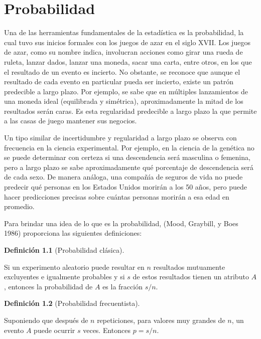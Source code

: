\documentclass[
  us-letterpaper,
]{scrreprt}
\theoremstyle{plain}
\theoremstyle{definition}
\newtheorem{definition}{Definición}[chapter]
\theoremstyle{definition}
\theoremstyle{plain}
\theoremstyle{remark}
\begin{document}
\chapter{Probabilidad}\label{probabilidad}

Una de las herramientas fundamentales de la estadística es la
probabilidad, la cual tuvo sus inicios formales con los juegos de azar
en el siglo XVII. Los juegos de azar, como su nombre indica, involucran
acciones como girar una rueda de ruleta, lanzar dados, lanzar una
moneda, sacar una carta, entre otros, en los que el resultado de un
evento es incierto. No obstante, se reconoce que aunque el resultado de
cada evento en particular pueda ser incierto, existe un patrón
predecible a largo plazo. Por ejemplo, se sabe que en múltiples
lanzamientos de una moneda ideal (equilibrada y simétrica),
aproximadamente la mitad de los resultados serán caras. Es esta
regularidad predecible a largo plazo la que permite a las casas de juego
mantener sus negocios.

Un tipo similar de incertidumbre y regularidad a largo plazo se observa
con frecuencia en la ciencia experimental. Por ejemplo, en la ciencia de
la genética no se puede determinar con certeza si una descendencia será
masculina o femenina, pero a largo plazo se sabe aproximadamente qué
porcentaje de descendencia será de cada sexo. De manera análoga, una
compañía de seguros de vida no puede predecir qué personas en los
Estados Unidos morirán a los 50 años, pero puede hacer predicciones
precisas sobre cuántas personas morirán a esa edad en promedio.

Para brindar una idea de lo que es la probabilidad, (Mood, Graybill, y
Boes 1986) proporciona las siguientes definiciones:

\begin{definition}[Probabilidad
clásica]\protect\hypertarget{def-pclas}{}\label{def-pclas}

Si un experimento aleatorio puede resultar en \(n\) resultados
mutuamente excluyentes e igualmente probables y si \(s\) de estos
resultados tienen un atributo \(A\), entonces la probabilidad de \(A\)
es la fracción \(s/n\).

\end{definition}

\begin{definition}[Probabilidad
frecuentista]\protect\hypertarget{def-pfrec}{}\label{def-pfrec}

Suponiendo que después de \(n\) repeticiones, para valores muy grandes
de \(n\), un evento \(A\) puede ocurrir \(s\) veces. Entonces \(p=s/n\).

\end{definition}
\end{document}
